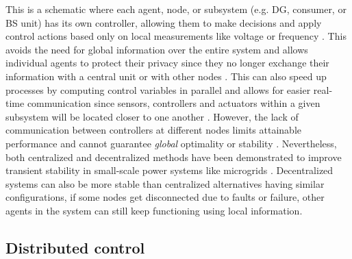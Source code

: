 \documentclass[final,3p,times]{elsarticle}
\begin{document}
This is a schematic where each agent, node, or subsystem (e.g. DG, consumer, or BS unit) has its own controller, allowing them to make decisions and apply control actions based only on local measurements like voltage or frequency \cite{pourbabak2017}. This avoids the need for global information over the entire system and allows individual agents to protect their privacy since they no longer exchange their information with a central unit or with other nodes \cite{gan2012}. This can also speed up processes by computing control variables in parallel and allows for easier real-time communication since sensors, controllers and actuators within a given subsystem will be located closer to one another \cite{farina2012}. However, the lack of communication between controllers at different nodes limits attainable performance and cannot guarantee \textit{global} optimality or stability \cite{pourbabak2017}. Nevertheless, both centralized and decentralized methods have been demonstrated to improve transient stability in small-scale power systems like microgrids \cite{senjyu2005}. Decentralized systems can also be more stable than centralized alternatives having similar configurations, if some nodes get disconnected due to faults or failure, other agents in the system can still keep functioning using local information.

\subsection{Distributed control}
\end{document}
